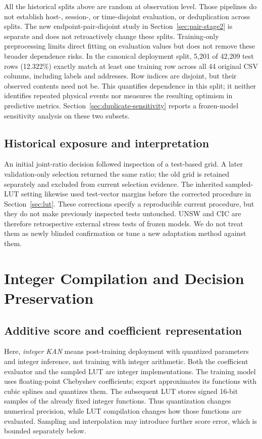\documentclass{ieeeaccess}
\begin{document}
All the historical splits above are random at observation level. Those pipelines do not establish host-, session-, or time-disjoint evaluation, or deduplication across splits. The new endpoint-pair-disjoint study in Section~\ref{sec:pair-stage2} is separate and does not retroactively change these splits. Training-only preprocessing limits direct fitting on evaluation values but does not remove these broader dependence risks. In the canonical deployment split, 5,201 of 42,209 test rows (12.322\%) exactly match at least one training row across all 44 original CSV columns, including labels and addresses. Row indices are disjoint, but their observed contents need not be. This quantifies dependence in this split; it neither identifies repeated physical events nor measures the resulting optimism in predictive metrics. Section~\ref{sec:duplicate-sensitivity} reports a frozen-model sensitivity analysis on these two subsets.

\subsection{Historical exposure and interpretation}
An initial joint-ratio decision followed inspection of a test-based grid. A later validation-only selection returned the same ratio; the old grid is retained separately and excluded from current selection evidence. The inherited sampled-LUT setting likewise used test-vector margins before the corrected procedure in Section~\ref{sec:lut}. These corrections specify a reproducible current procedure, but they do not make previously inspected tests untouched. UNSW and CIC are therefore retrospective external stress tests of frozen models. We do not treat them as newly blinded confirmation or tune a new adaptation method against them.

\section{Integer Compilation and Decision Preservation}
\subsection{Additive score and coefficient representation}
Here, \emph{integer KAN} means post-training deployment with quantized parameters and integer inference, not training with integer arithmetic. Both the coefficient evaluator and the sampled LUT are integer implementations. The training model uses floating-point Chebyshev coefficients; export approximates its functions with cubic splines and quantizes them. The subsequent LUT stores signed 16-bit samples of the already fixed integer functions. Thus quantization changes numerical precision, while LUT compilation changes how those functions are evaluated. Sampling and interpolation may introduce further score error, which is bounded separately below.
\end{document}
